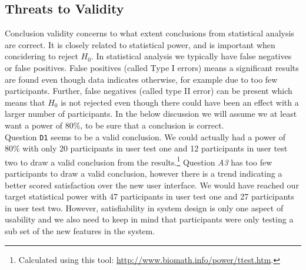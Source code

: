 

\subsection{Threats to Validity}
\label{sub-sec:user-test-validity}
Conclusion validity concerns to what extent conclusions from statistical analysis are correct. It is closely related to statistical power, and is important when concidering to reject $H_0$. In statistical analysis we typically have false negatives or false positives. False positives (called Type I errors) means a significant results are found even though data indicates otherwise, for example due to too few participants. Further, false negatives (called type II error) can be present which means that $H_0$ is not rejected even though there could have been an effect with a larger number of participants. In the below discussion we will assume we at least want a power of 80\%, to be sure that a conclusion is correct. \\

Question \texttt{D1} seems to be a valid conclusion. We could actually had a power of 80\% with only 20 participants in user test one and 12 participants in user test two to draw a valid conclusion from the results.\footnote{Calculated using this tool: \url{http://www.biomath.info/power/ttest.htm}.} Question \textit{A3} has too few participants to draw a valid conclusion, however there is a trend indicating a better scored satisfaction over the new user interface. We would have reached our target statistical power with 47 participants in user test one and 27 participants in user test two. However, satisfiability in system design is only one aspect of usability and we also need to keep in mind that participants were only testing a sub set of the new features in the system. \\

